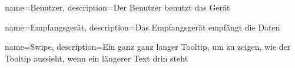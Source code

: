 {
    name=Benutzer,
    description={Der Benutzer benutzt das Gerät}
}

{
    name=Empfangsgerät,
    description={Das Empfangsgerät empfängt die Daten}
}

{
    name=Swipe,
    description={Ein ganz ganz langer Tooltip, um zu zeigen, wie der Tooltip aussieht, wenn ein längerer Text drin steht}
}
